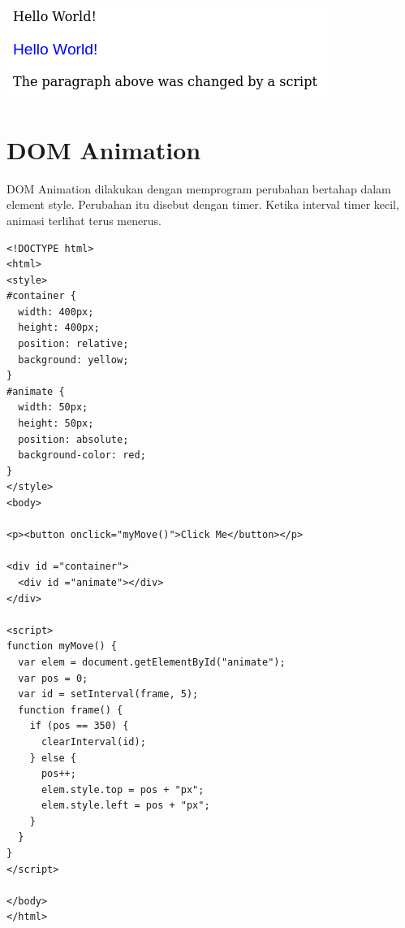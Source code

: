 \documentclass[a4paper,12pt]{article}
\begin{document}
\begin{center}
    \includegraphics[scale=.7]{4.png} 
\end{center}

\section*{DOM Animation}
DOM Animation dilakukan dengan memprogram perubahan bertahap dalam element style. Perubahan itu disebut dengan timer. Ketika interval timer kecil, animasi terlihat terus menerus.
\begin{lstlisting}
<!DOCTYPE html>
<html>
<style>
#container {
  width: 400px;
  height: 400px;
  position: relative;
  background: yellow;
}
#animate {
  width: 50px;
  height: 50px;
  position: absolute;
  background-color: red;
}
</style>
<body>

<p><button onclick="myMove()">Click Me</button></p> 

<div id ="container">
  <div id ="animate"></div>
</div>

<script>
function myMove() {
  var elem = document.getElementById("animate");   
  var pos = 0;
  var id = setInterval(frame, 5);
  function frame() {
    if (pos == 350) {
      clearInterval(id);
    } else {
      pos++; 
      elem.style.top = pos + "px"; 
      elem.style.left = pos + "px"; 
    }
  }
}
</script>

</body>
</html>
\end{lstlisting}
\end{document}
